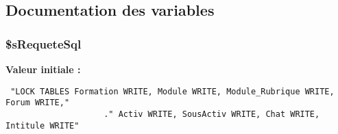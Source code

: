 \subsection{Documentation des variables}
\subsubsection{\setlength{\rightskip}{0pt plus 5cm}\$sRequeteSql}\label{copie__ss__activ_8php_7fd44c997b9477ef9cf33ccb4eb5545e}


\textbf{Valeur initiale :}

\begin{Code}\begin{verbatim} "LOCK TABLES Formation WRITE, Module WRITE, Module_Rubrique WRITE, Forum WRITE,"
                    ." Activ WRITE, SousActiv WRITE, Chat WRITE, Intitule WRITE"
\end{verbatim}
\end{Code}
